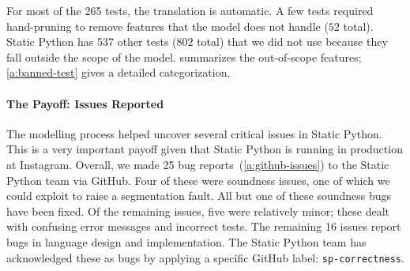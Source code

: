 \documentclass[english,cleveref,submission]{programming}
\newcommand{\SP}{Static Python}
\newcommand{\totalnum}[1]{$#1$ total}
\newcommand{\numSPtest}{265}
\newcommand{\numSPtotal}{802} %
\newcommand{\numSPdiff}{537} %
\begin{document}
For most of the \numSPtest{} tests, the translation is automatic.
A few tests required hand-pruning to remove features that the model does not
handle (\totalnum{52}).
\SP{} has \numSPdiff{} other tests (\totalnum{\numSPtotal{}}) that we did not
use because they fall outside the scope of the model.
 summarizes the out-of-scope features; \cref{a:banned-test} gives
a detailed categorization.



\paragraph{The Payoff: Issues Reported}


The modelling process helped uncover several critical issues in \SP{}.
This is a very important payoff given that \SP{} is running in production at
Instagram.
Overall, we made 25 bug reports~(\cref{a:github-issues}) to the \SP{} team via GitHub.
Four of these were soundness issues, one of which we could exploit to raise
a segmentation fault.
All but one of these soundness bugs have been fixed.
Of the remaining issues, five were relatively minor; these dealt with confusing error messages
and incorrect tests.
The remaining 16 issues report bugs in language design and implementation.
The \SP{} team has acknowledged these as bugs by applying a specific GitHub label: \lstinline{sp-correctness}.
\end{document}
